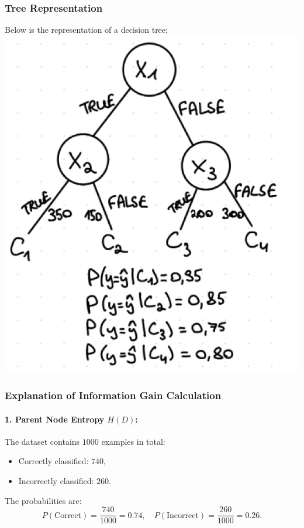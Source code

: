 \documentclass[10pt,a4paper]{article}
\begin{document}
\subsubsection*{Tree Representation}
Below is the representation of a decision tree:
\includegraphics{Screenshot 2025-01-09 at 11.52.49.png}
\subsubsection*{Explanation of Information Gain Calculation}

\paragraph{1. Parent Node Entropy \(H(D)\):}
The dataset contains \(1000\) examples in total:
\begin{itemize}
    \item Correctly classified: \(740\),
    \item Incorrectly classified: \(260\).
\end{itemize}

The probabilities are:
\[
P(\text{Correct}) = \frac{740}{1000} = 0.74, \quad P(\text{Incorrect}) = \frac{260}{1000} = 0.26.
\]
\end{document}
